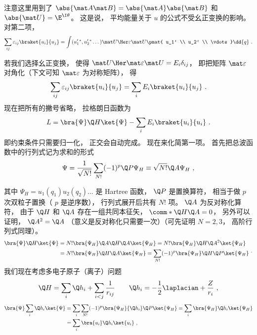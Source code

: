 注意这里用到了 $\abs{\mat A\mat B} = \abs{\mat A}\abs{\mat B}$ 和 $\abs{\mat U}= {\E^{\I \theta}}$。  这是说， 平均能量关于 $u$ 的公式不受幺正变换的影响。 对第二项，
\begin{equation}
\sum_{ij}  \varepsilon_{ij} \braket{u_i}{u_j}
= \int (u'_1{}^* ,u'_2{}^* \dots) \mat U\Her \varepsilon \mat U
\pmat{ u_1' \\ u_2' \\ \vdots} \dd{q}~.
\end{equation}

若我们选择幺正变换， 使得 ${\mat U\Her }\mat \varepsilon \mat U = {E_i}{\delta_{ij}}$， %
即把矩阵 $\mat \varepsilon$ 对角化（下文可知 $\mat\varepsilon$ 为对称矩阵）， 得
\begin{equation}
\sum_{ij} \varepsilon_{ij} \braket{u_i}{u_j}
= \sum_i {E_i}  \braket{u_i}{u_j}~.
\end{equation}
现在把所有的撇号省略， 拉格朗日函数为
\begin{equation}
L =\bra{\Psi}\Q H \ket{\Psi}  - \sum_i E_i \braket{u_i}{u_i}~.
\end{equation}
即约束条件只需要归一化， 正交会自动完成。 现在来化简第一项。 首先把总波函数中的行列式记为求和的形式
\begin{equation}
\Psi  = \frac{1}{\sqrt {N!}} \sum_{N!} (-1)^p \Q P{\Psi_H}  \equiv \sqrt{N!} \Q A \Psi_H~,
\end{equation}

其中 $\Psi_H = u_1(q_1) u_2(q_2)\dots$ 是 Hartree 函数，  $\Q P$ 是置换算符， 相当于做 $p$ 次双粒子置换（ $p$ 是逆序数）， 行列式展开后共有 $N!$ 项。  $\Q A$ 为反对称化算符， 由于 $\Q H$ 和 $\Q A$ 存在一组共同本征矢， $\comm*{\Q H}{\Q A} = 0$，  另外可以证明， $\Q A^2 = \Q A$ （意义是反对称化只需要一次）（可先证明 $N = 2,3$，  高阶行列式同理）。
\begin{equation}
\begin{aligned}
\bra{\Psi}\Q H\ket{\Psi}  &= N!\bra{\Psi_H} \Q A\Q H\Q A \ket{\Psi_H} = N!\bra{\Psi_H}\Q H \Q A^2\ket{\Psi_H} \\
&= N!\bra{\Psi_H} \Q H\Q A\ket{\Psi_H}   = \sum_{N!} (-1)^p \bra{\Psi_H}\Q H\Q P\ket{\Psi_H}\\ 
\end{aligned}~.
\end{equation}
我们现在考虑多电子原子（离子）问题
\begin{equation}
\Q H = \sum_i \Q h_i + \sum_{i < j} \frac{1}{r_{ij}} \qquad
\Q h_i =  - \frac12 \laplacian + \frac{Z}{r_i}~,
\end{equation}
\begin{equation}
\begin{aligned}
\bra{\Psi}\sum_i \Q h_i \ket{\Psi} & = \sum_i \sum_{N!} ( - 1)^p \bra{\Psi_H}{\Q h_i}\Q P \ket{\Psi_H} = \sum_i \bra{\Psi_H} \Q h_i \ket{\Psi_H}\\
&= \sum_i \bra{u_i} \Q h_i \ket{u_i}~,
\end{aligned}
\end{equation}
 
